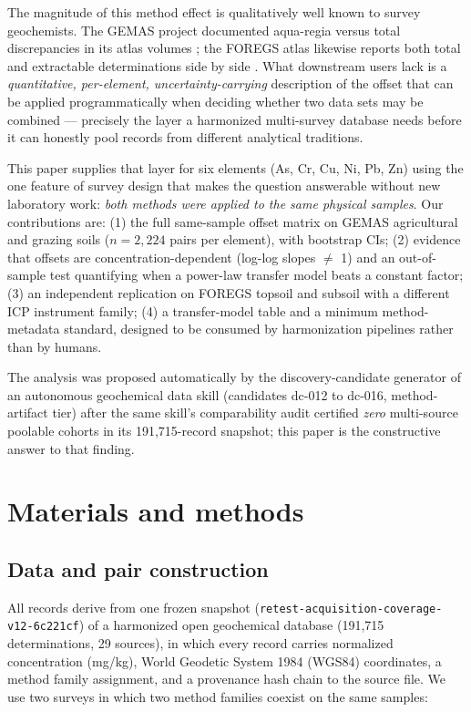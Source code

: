\documentclass[11pt]{article}
\begin{document}
The magnitude of this method effect is qualitatively well known to survey
geochemists. The GEMAS project documented aqua-regia versus total
discrepancies in its atlas volumes \cite{reimann2014}; the FOREGS atlas
likewise reports both total and extractable determinations side by side
\cite{salminen2005,devos2006}. What downstream users lack is a
\emph{quantitative, per-element, uncertainty-carrying} description of the
offset that can be applied programmatically when deciding whether two data
sets may be combined --- precisely the layer a harmonized multi-survey
database needs before it can honestly pool records from different
analytical traditions.

This paper supplies that layer for six elements (As, Cr, Cu, Ni, Pb, Zn)
using the one feature of survey design that makes the question answerable
without new laboratory work: \emph{both methods were applied to the same
physical samples}. Our contributions are:
(1) the full same-sample offset matrix on GEMAS agricultural and grazing
soils ($n{=}2{,}224$ pairs per element), with bootstrap CIs;
(2) evidence that offsets are concentration-dependent (log-log slopes
$\ne$ 1) and an out-of-sample test quantifying when a power-law transfer
model beats a constant factor;
(3) an independent replication on FOREGS topsoil and subsoil with a
different ICP instrument family;
(4) a transfer-model table and a minimum method-metadata standard, designed
to be consumed by harmonization pipelines rather than by humans.

The analysis was proposed automatically by the discovery-candidate
generator of an autonomous geochemical data skill (candidates dc-012 to
dc-016, method-artifact tier) after the same skill's comparability audit
certified \emph{zero} multi-source poolable cohorts in its 191,715-record
snapshot; this paper is the constructive answer to that finding.

\section{Materials and methods}

\subsection{Data and pair construction}
\label{sec:pairs}
All records derive from one frozen snapshot
(\texttt{retest-acquisition-coverage-v12-6c221cf}) of a harmonized open
geochemical database (191,715 determinations, 29 sources), in which every
record carries normalized concentration (mg/kg), World Geodetic System 1984
(WGS84) coordinates, a method family assignment, and a provenance hash
chain to the source file. We use two surveys in which two method families
coexist on the same samples:
\end{document}
